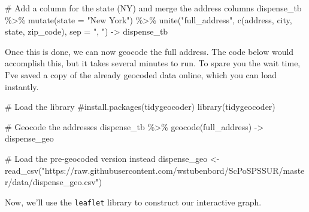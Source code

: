 \documentclass[
  letterpaper,
]{book}
\newenvironment{Shaded}{\begin{snugshade}}{\end{snugshade}}
\newcommand{\AttributeTok}[1]{\textcolor[rgb]{0.40,0.45,0.13}{#1}}
\newcommand{\CommentTok}[1]{\textcolor[rgb]{0.37,0.37,0.37}{#1}}
\newcommand{\FunctionTok}[1]{\textcolor[rgb]{0.28,0.35,0.67}{#1}}
\newcommand{\NormalTok}[1]{\textcolor[rgb]{0.00,0.23,0.31}{#1}}
\newcommand{\OtherTok}[1]{\textcolor[rgb]{0.00,0.23,0.31}{#1}}
\newcommand{\SpecialCharTok}[1]{\textcolor[rgb]{0.37,0.37,0.37}{#1}}
\newcommand{\StringTok}[1]{\textcolor[rgb]{0.13,0.47,0.30}{#1}}
\begin{document}
\begin{Shaded}
\begin{Highlighting}[]
\CommentTok{\# Add a column for the state (NY) and merge the address columns}
\NormalTok{dispense\_tb }\SpecialCharTok{\%\textgreater{}\%}
  \FunctionTok{mutate}\NormalTok{(}\AttributeTok{state =} \StringTok{"New York"}\NormalTok{) }\SpecialCharTok{\%\textgreater{}\%}
  \FunctionTok{unite}\NormalTok{(}\StringTok{"full\_address"}\NormalTok{, }
        \FunctionTok{c}\NormalTok{(}\StringTok{\textquotesingle{}address\textquotesingle{}}\NormalTok{, }\StringTok{\textquotesingle{}city\textquotesingle{}}\NormalTok{, }\StringTok{\textquotesingle{}state\textquotesingle{}}\NormalTok{, }\StringTok{\textquotesingle{}zip\_code\textquotesingle{}}\NormalTok{), }
        \AttributeTok{sep =} \StringTok{", "}\NormalTok{) }\OtherTok{{-}\textgreater{}}\NormalTok{ dispense\_tb}
\end{Highlighting}
\end{Shaded}

Once this is done, we can now geocode the full address. The code below
would accomplish this, but it takes several minutes to run. To spare you
the wait time, I've saved a copy of the already geocoded data online,
which you can load instantly.

\begin{Shaded}
\begin{Highlighting}[]
\CommentTok{\# Load the library}
\CommentTok{\#install.packages(\textquotesingle{}tidygeocoder\textquotesingle{})}
\FunctionTok{library}\NormalTok{(tidygeocoder)}

\CommentTok{\# Geocode the addresses}
\NormalTok{dispense\_tb }\SpecialCharTok{\%\textgreater{}\%}
  \FunctionTok{geocode}\NormalTok{(full\_address) }\OtherTok{{-}\textgreater{}}\NormalTok{ dispense\_geo}
\end{Highlighting}
\end{Shaded}

\begin{Shaded}
\begin{Highlighting}[]
\CommentTok{\# Load the pre{-}geocoded version instead}
\NormalTok{dispense\_geo }\OtherTok{\textless{}{-}} \FunctionTok{read\_csv}\NormalTok{(}\StringTok{"https://raw.githubusercontent.com/wstubenbord/ScPoSPSSUR/master/data/dispense\_geo.csv"}\NormalTok{)}
\end{Highlighting}
\end{Shaded}

Now, we'll use the \texttt{leaflet} library to construct our interactive
graph.
\end{document}
